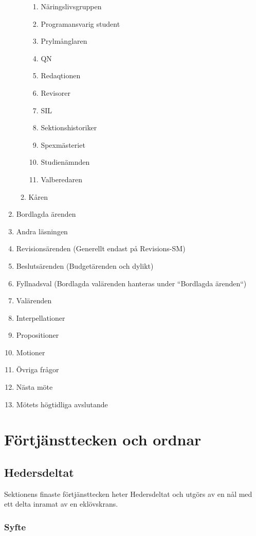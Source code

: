\documentclass[a4paper,12pt]{article}
\begin{document}
\begin{enumerate}
\begin{enumerate}
\begin{enumerate}
          \item Näringslivsgruppen
          \item Programansvarig student
          \item Prylmånglaren
          \item QN
          \item Redaqtionen
          \item Revisorer
          \item SIL
          \item Sektionshistoriker
          \item Spexmästeriet
          \item Studienämnden
          \item Valberedaren
      \end{enumerate}
      \item Kåren
  \end{enumerate}
  \item Bordlagda ärenden
  \item Andra läsningen
  \item Revisionsärenden (Generellt endast på Revisions-SM)
  \item Beslutsärenden (Budgetärenden och dylikt)
  \item Fyllnadsval (Bordlagda valärenden hanteras under ``Bordlagda ärenden``)
  \item Valärenden
  \item Interpellationer
  \item Propositioner
  \item Motioner
  \item Övriga frågor
  \item Nästa möte
  \item Mötets högtidliga avslutande
\end{enumerate}

\section{Förtjänsttecken och ordnar}

\subsection{Hedersdeltat}

Sektionens finaste förtjänsttecken heter Hedersdeltat och utgörs av en nål med ett delta inramat av en eklövskrans.

\subsubsection{Syfte}
\end{document}
